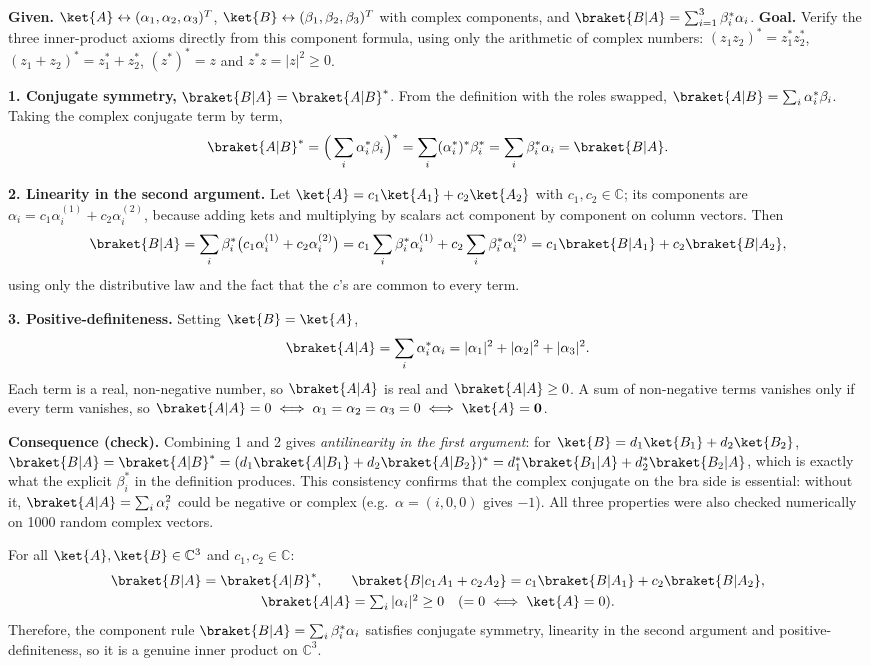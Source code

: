 \begin{solutionbox}
\textbf{Given.} $\ket{A}\leftrightarrow(\alpha_1,\alpha_2,\alpha_3)^{T}$, $\ket{B}\leftrightarrow(\beta_1,\beta_2,\beta_3)^{T}$ with complex components, and $\braket{B|A}=\sum_{i=1}^{3}\beta_i^*\alpha_i$. \textbf{Goal.} Verify the three inner-product axioms directly from this component formula, using only the arithmetic of complex numbers: $(z_1z_2)^*=z_1^*z_2^*$, $(z_1+z_2)^*=z_1^*+z_2^*$, $(z^*)^*=z$ and $z^*z=|z|^2\ge0$.

\textbf{1. Conjugate symmetry,} $\braket{B|A}=\braket{A|B}^*$. From the definition with the roles swapped, $\braket{A|B}=\sum_i\alpha_i^*\beta_i$. Taking the complex conjugate term by term,
\[
\braket{A|B}^*=\Big(\sum_i\alpha_i^*\beta_i\Big)^*=\sum_i(\alpha_i^*)^*\beta_i^*=\sum_i\beta_i^*\alpha_i=\braket{B|A}.
\]

\textbf{2. Linearity in the second argument.} Let $\ket{A}=c_1\ket{A_1}+c_2\ket{A_2}$ with $c_1,c_2\in\mathbb{C}$; its components are $\alpha_i=c_1\alpha_i^{(1)}+c_2\alpha_i^{(2)}$, because adding kets and multiplying by scalars act component by component on column vectors. Then
\[
\braket{B|A}=\sum_i\beta_i^*\big(c_1\alpha_i^{(1)}+c_2\alpha_i^{(2)}\big)
=c_1\sum_i\beta_i^*\alpha_i^{(1)}+c_2\sum_i\beta_i^*\alpha_i^{(2)}
=c_1\braket{B|A_1}+c_2\braket{B|A_2},
\]
using only the distributive law and the fact that the $c$'s are common to every term.

\textbf{3. Positive-definiteness.} Setting $\ket{B}=\ket{A}$,
\[
\braket{A|A}=\sum_i\alpha_i^*\alpha_i=|\alpha_1|^2+|\alpha_2|^2+|\alpha_3|^2 .
\]
Each term is a real, non-negative number, so $\braket{A|A}$ is real and $\braket{A|A}\ge0$. A sum of non-negative terms vanishes only if every term vanishes, so $\braket{A|A}=0\iff\alpha_1=\alpha_2=\alpha_3=0\iff\ket{A}=\mathbf 0$.

\textbf{Consequence (check).} Combining 1 and 2 gives \emph{antilinearity in the first argument}: for $\ket{B}=d_1\ket{B_1}+d_2\ket{B_2}$, $\braket{B|A}=\braket{A|B}^*=(d_1\braket{A|B_1}+d_2\braket{A|B_2})^*=d_1^*\braket{B_1|A}+d_2^*\braket{B_2|A}$, which is exactly what the explicit $\beta_i^*$ in the definition produces. This consistency confirms that the complex conjugate on the bra side is essential: without it, $\braket{A|A}=\sum_i\alpha_i^2$ could be negative or complex (e.g.\ $\alpha=(i,0,0)$ gives $-1$). All three properties were also checked numerically on 1000 random complex vectors.
\end{solutionbox}

\begin{answerbox}
For all $\ket{A},\ket{B}\in\mathbb{C}^3$ and $c_1,c_2\in\mathbb{C}$:
\begin{gather*}
\braket{B|A}=\braket{A|B}^*,\qquad
\braket{B|c_1A_1+c_2A_2}=c_1\braket{B|A_1}+c_2\braket{B|A_2},\\
\braket{A|A}=\textstyle\sum_i|\alpha_i|^2\ge0\quad(=0\iff\ket{A}=0).
\end{gather*}
Therefore, the component rule $\braket{B|A}=\sum_i\beta_i^*\alpha_i$ satisfies conjugate symmetry, linearity in the second argument and positive-definiteness, so it is a genuine inner product on $\mathbb{C}^3$.
\end{answerbox}


